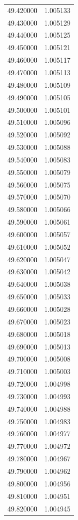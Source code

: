 \begin{tabular}{rr}
49.420000 & 1.005133 \\
49.430000 & 1.005129 \\
49.440000 & 1.005125 \\
49.450000 & 1.005121 \\
49.460000 & 1.005117 \\
49.470000 & 1.005113 \\
49.480000 & 1.005109 \\
49.490000 & 1.005105 \\
49.500000 & 1.005101 \\
49.510000 & 1.005096 \\
49.520000 & 1.005092 \\
49.530000 & 1.005088 \\
49.540000 & 1.005083 \\
49.550000 & 1.005079 \\
49.560000 & 1.005075 \\
49.570000 & 1.005070 \\
49.580000 & 1.005066 \\
49.590000 & 1.005061 \\
49.600000 & 1.005057 \\
49.610000 & 1.005052 \\
49.620000 & 1.005047 \\
49.630000 & 1.005042 \\
49.640000 & 1.005038 \\
49.650000 & 1.005033 \\
49.660000 & 1.005028 \\
49.670000 & 1.005023 \\
49.680000 & 1.005018 \\
49.690000 & 1.005013 \\
49.700000 & 1.005008 \\
49.710000 & 1.005003 \\
49.720000 & 1.004998 \\
49.730000 & 1.004993 \\
49.740000 & 1.004988 \\
49.750000 & 1.004983 \\
49.760000 & 1.004977 \\
49.770000 & 1.004972 \\
49.780000 & 1.004967 \\
49.790000 & 1.004962 \\
49.800000 & 1.004956 \\
49.810000 & 1.004951 \\
49.820000 & 1.004945 \\

\end{tabular}
